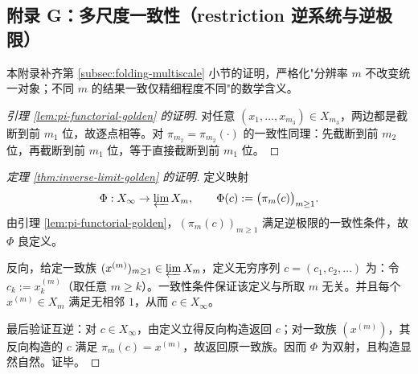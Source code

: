 \subsection{附录 G：多尺度一致性（restriction 逆系统与逆极限）}\label{app:multiscale-inverse-limit}

本附录补齐第 \ref{subsec:folding-multiscale} 小节的证明，严格化"分辨率 $m$ 不改变统一对象；不同 $m$ 的结果一致仅精细程度不同"的数学含义。

\begin{proof}[引理 \ref{lem:pi-functorial-golden} 的证明]
对任意 $(x_1,\dots,x_{m_3})\in X_{m_3}$，两边都是截断到前 $m_1$ 位，故逐点相等。对 $\pi_{m_2}=\pi_{m_2}(\cdot)$ 的一致性同理：先截断到前 $m_2$ 位，再截断到前 $m_1$ 位，等于直接截断到前 $m_1$ 位。
\end{proof}

\begin{proof}[定理 \ref{thm:inverse-limit-golden} 的证明]
定义映射
\[
\Phi:X_\infty\to \varprojlim X_m,\qquad
\Phi(c):=\bigl(\pi_m(c)\bigr)_{m\ge 1}.
\]
由引理 \ref{lem:pi-functorial-golden}，$(\pi_m(c))_{m\ge 1}$ 满足逆极限的一致性条件，故 $\Phi$ 良定义。

反向，给定一致族 $(x^{(m)})_{m\ge 1}\in\varprojlim X_m$，定义无穷序列 $c=(c_1,c_2,\dots)$ 为：令 $c_k:=x^{(m)}_k$（取任意 $m\ge k$）。一致性条件保证该定义与所取 $m$ 无关。并且每个 $x^{(m)}\in X_m$ 满足无相邻 $1$，从而 $c\in X_\infty$。

最后验证互逆：对 $c\in X_\infty$，由定义立得反向构造返回 $c$；对一致族 $(x^{(m)})$，其反向构造的 $c$ 满足 $\pi_m(c)=x^{(m)}$，故返回原一致族。因而 $\Phi$ 为双射，且构造显然自然。证毕。
\end{proof}

